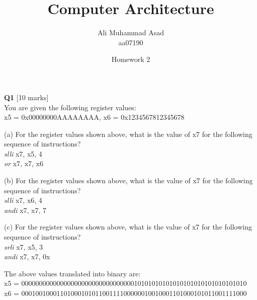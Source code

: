 \documentclass[addpoints]{exam}
\title{Computer Architecture}
\author{Ali Muhammad Asad \\ aa07190}
\date{Homework 2}
\begin{document}
\maketitle

\begin{center}
    \gradetable[h][questions]
\end{center}
\begin{sloppypar}
\begin{questions}
    \question[10]
    \textbf{Q1} [10 marks]\\ You are given the following register values: \\ \hspace*{6mm}x5 = 0x00000000AAAAAAAA, x6 = 0x1234567812345678

    (a) For the register values shown above, what is the value of x7 for the following sequence of \hspace*{6mm}instructions? \\ \hspace*{7mm} \textit{slli}  x7, x5, 4  \\ 
    \hspace*{7mm} \textit{or}  x7, x7, x6 
    
    \vspace*{2mm}
    (b) For the register values shown above, what is the value of x7 for the following sequence of \hspace*{6mm}instructions? \\ 
    \hspace*{7mm} \textit{slli} x7, x6, 4 \\ \hspace*{7mm} \textit{andi} x7, x7, 7

    \vspace*{2mm}
    (c) For the register values shown above, what is the value of x7 for the following sequence of \hspace*{6mm}instructions? \\ \hspace*{7mm} \textit{srli} x7, x5, 3 \\ \hspace*{7mm} \textit{andi} x7, x7, 0x
    \begin{solution}
        The above values translated into binary are: \\ 
            x5 = 0000000000000000000000000000000010101010101010101010101010101010 \\ 
            x6 = 0001001000110100010101100111100000010010001101000101011001111000


\end{solution}
\end{questions}
\end{sloppypar}
\end{document}
